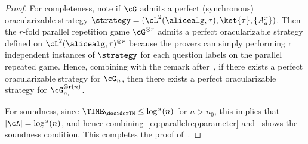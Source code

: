 \begin{proof}
	For completeness, note if $\cG$ admits a perfect (synchronous) oracularizable strategy $\strategy = ( \cL^2(\alicealg, \tau), \\ \ket{\tau}, \{ A_{a}^x \} )$. Then the $r$-fold parallel repetition game $\cG^{\otimes r}$ admits a perfect oracularizable strategy defined on $\cL^2(\alicealg, \tau)^{\otimes r}$ because the provers can simply performing r independent instances of $\strategy$ for each question labels on the parallel repeated game. Hence, combining with the remark after~, if there exists a perfect oracularizable strategy for $\cG_n$, then there exists a perfect oracularizable strategy for $\cG_{n, \bot}^{\otimes \mathbf{r}(n)}$.
	
	For soundness, since $\TIME_{ \deciderTM} \leq \log^{\alpha}(n)$ for $n > n_0$, this implies that $|\cA| = \log^{\alpha}(n)$, and hence combining~\eqref{eq:parallelrepparameter} and~ shows the soundness condition. This completes the proof of~.
	

	
	 
	 
\end{proof}

